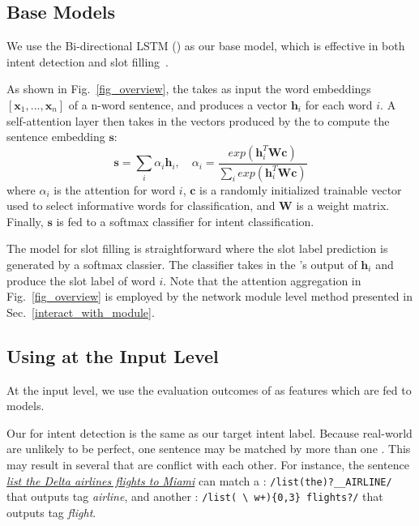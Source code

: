 \subsection{Base Models}
We use the Bi-directional LSTM (\BLSTM) as our base \NN model, which is effective in both intent detection and slot
filling~\cite{liu2016attention}.

 As shown in Fig.~\ref{fig_overview}, the \BLSTM takes as input the word embeddings $[\textbf{x}_1, ...,
\textbf{x}_n]$ of a n-word sentence, and produces a vector $\textbf{h}_i$ for each word $i$. A self-attention layer then takes in the
vectors produced by the \BLSTM to compute the sentence embedding $\textbf{s}$:
\begin{equation}
\textbf{s} = \sum_{i}{\alpha_i\textbf{h}_i}, \quad \alpha_i=\frac{exp(\textbf{h}_i^T\textbf{Wc})}{\sum_{i}{exp(\textbf{h}_i^T\textbf{Wc})}}
\label{eq:simple_att}
\end{equation}
where  $\alpha_i$ is the attention for word $i$, $\textbf{c}$ is a randomly initialized trainable vector used to select informative words for classification, and $\textbf{W}$ is a weight matrix.
Finally, $\textbf{s}$ is fed to a softmax classifier for intent classification.

 The model for slot filling is  straightforward where the slot label prediction is generated by a softmax
classier.  The classifier takes in the \BLSTM's output of $\textbf{h}_i$ and produce the slot label of word $i$. Note that the attention
aggregation in Fig.~\ref{fig_overview} is employed by the network module level method presented in Sec.~\ref{interact_with_module}.


\subsection{Using \REs at the Input Level}
\label{fusion_with_input}
At the input level, we use the evaluation outcomes of \REs as features which are fed to \NN models.

Our \REtag for intent detection is the same as our target intent label.
Because real-world \REs are unlikely to be perfect, one sentence may be matched by more than one \RE. This may result in several \REtags
that are conflict with each other. For instance, the sentence \textsl{\underline{list the Delta airlines flights to Miami}} can match a
\RE: {\small \texttt{/list(\;the)?\;\_\_AIRLINE/}} that outputs tag \emph{airline}, and another \RE: {\small \texttt{/list(\,\textbackslash
w+)\{0,3\} flights?/}} that outputs tag \emph{flight}.

